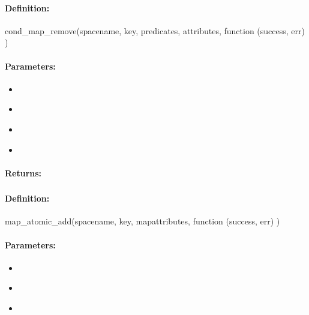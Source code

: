 \paragraph{Definition:}
\begin{javascriptcode}
cond_map_remove(spacename, key, predicates, attributes, function (success, err) {})
\end{javascriptcode}
\paragraph{Parameters:}
\begin{itemize}[noitemsep]
\item {}\\

\item {}\\

\item {}\\

\item {}\\

\end{itemize}

\paragraph{Returns:}


\pagebreak
\subsubsection{}
\label{api:nodejs:map_atomic_add}


\paragraph{Definition:}
\begin{javascriptcode}
map_atomic_add(spacename, key, mapattributes, function (success, err) {})
\end{javascriptcode}
\paragraph{Parameters:}
\begin{itemize}[noitemsep]
\item {}\\

\item {}\\

\item {}\\

\end{itemize}

